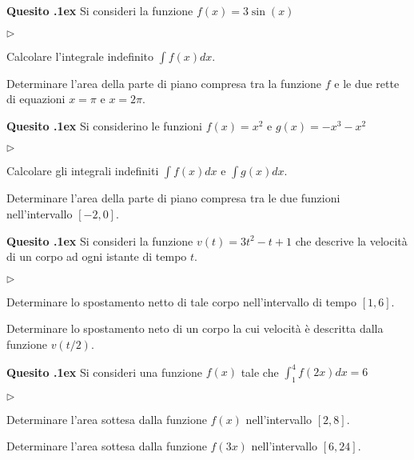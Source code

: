 \documentclass[11pt,twoside,a4paper]{article}
\newcommand{\mylabel}[1]{#1\hfill}
\renewenvironment{itemize}
  {\begin{list}{$\triangleright$}{%
   \setlength{\parskip}{0mm}
   \setlength{\topsep}{.4\baselineskip}
   \setlength{\rightmargin}{0mm}
   \setlength{\listparindent}{0mm}
   \setlength{\itemindent}{0mm}
   \setlength{\labelwidth}{2ex}
   \setlength{\itemsep}{.4\baselineskip}
   \setlength{\parsep}{0mm}
   \setlength{\partopsep}{0mm}
   \setlength{\labelsep}{1ex}
   \setlength{\leftmargin}{\labelwidth+\labelsep}
   \let\makelabel\mylabel}}{%
   \end{list}\vspace*{-1.3mm}}
\newcounter{quesito}
\newenvironment{question}{\bigskip\addtocounter{quesito}{1}\bigskip\bigskip\par\textbf{Quesito \thequesito.\kern1ex}}{\vspace{\parskip}}
\begin{document}
\begin{question}
Si consideri la funzione $f(x) = 3\sin(x)$
\begin{itemize}
\item[1.] Calcolare l'integrale indefinito $\displaystyle \int f(x) dx$.
\item[2.] Determinare l'area della parte di piano compresa tra la funzione $f$ e le due rette di equazioni $x = \pi$ e $x = 2 \pi$.
\end{itemize}
\end{question}
\begin{question}
Si considerino le funzioni $f(x) = x^2$ e $g(x) = -x^3 - x^2$
\begin{itemize}
\item[1.] Calcolare gli integrali indefiniti $\displaystyle \int f(x) dx$ e $\displaystyle \int g(x) dx$.
\item[2.] Determinare l'area della parte di piano compresa tra le due funzioni nell'intervallo $[-2, 0]$.
\end{itemize}
\end{question}
\begin{question}
Si consideri la funzione $v(t) = 3 t^2 - t +1$ che descrive la velocit\`a di un corpo ad ogni istante di tempo $t$.
\begin{itemize}
\item[1.] Determinare lo spostamento netto di tale corpo nell'intervallo di tempo $[1, 6]$.
\item[2.] Determinare lo spostamento neto di un corpo la cui velocit\`a \`e descritta dalla funzione $v(t/2)$.
\end{itemize}
\end{question}
\begin{question}
Si consideri una funzione $f(x)$ tale che $\displaystyle \int_1^4 f(2x) dx = 6$
\begin{itemize}
\item[1.] Determinare l'area sottesa dalla funzione $f(x)$ nell'intervallo $[2,8]$.
\item[2.] Determinare l'area sottesa dalla funzione $f(3x)$ nell'intervallo $[6,24]$.
\end{itemize}
\end{question}
\end{document}
